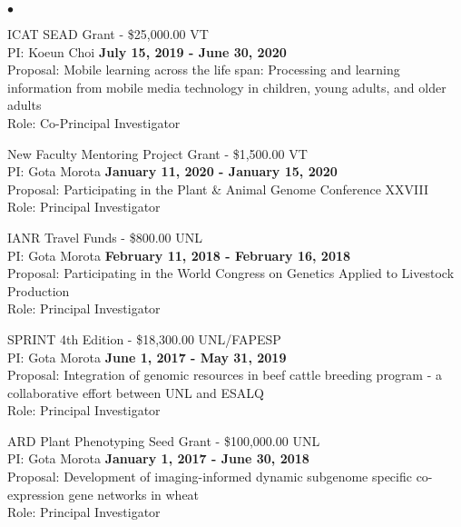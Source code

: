 \documentclass[margin,line,10pt]{res}
\newenvironment{list2}{
  \begin{list}{$\bullet$}{%
      \setlength{\itemsep}{0in}
      \setlength{\parsep}{0in} \setlength{\parskip}{0in}
      \setlength{\topsep}{0in} \setlength{\partopsep}{0in} 
      \setlength{\leftmargin}{0.2in}}}{\end{list}}
\begin{document}
\begin{resume}
\begin{list2}
\item ICAT SEAD Grant - \$25,000.00  \hfill VT\\
PI: Koeun Choi  \hfill \textbf{July 15, 2019 - June 30, 2020}\\
Proposal:  Mobile learning across the life span: Processing and learning information from mobile media technology in children, young adults, and older adults \\
Role: Co-Principal Investigator \\


\vspace{0.5cm}

\item New Faculty Mentoring Project Grant  - \$1,500.00  \hfill VT\\
PI: Gota Morota   \hfill \textbf{January 11, 2020 - January 15, 2020}\\
Proposal: Participating in the Plant \& Animal Genome Conference XXVIII\\
Role: Principal Investigator \\


\vspace{0.5cm}

\item IANR Travel Funds  - \$800.00  \hfill UNL\\
PI: Gota Morota   \hfill \textbf{February 11, 2018 - February 16, 2018}\\
Proposal: Participating in the World Congress on Genetics Applied to Livestock Production  \\
Role: Principal Investigator \\


\vspace{0.5cm}

\item SPRINT 4th Edition  - \$18,300.00  \hfill UNL/FAPESP\\
PI: Gota Morota   \hfill \textbf{June 1, 2017 - May 31, 2019}\\
Proposal: Integration of genomic resources in beef cattle breeding program - a collaborative effort between UNL and ESALQ  \\
Role: Principal Investigator \\


\vspace{0.5cm}
  
\item ARD Plant Phenotyping Seed Grant  - \$100,000.00  \hfill UNL\\
PI: Gota Morota   \hfill \textbf{January 1, 2017 - June 30, 2018}\\
Proposal: Development of imaging-informed dynamic subgenome specific co-expression gene networks in wheat  \\
Role: Principal Investigator \\


\end{list2}
\end{resume}
\end{document}
